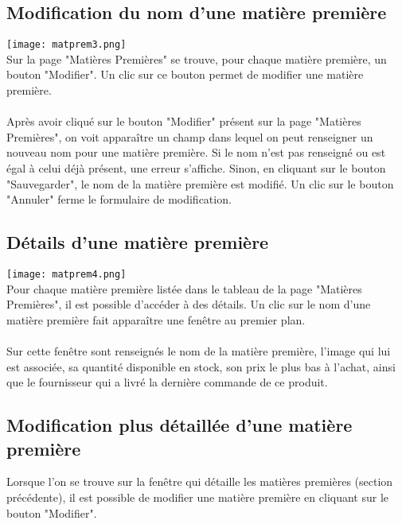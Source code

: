 \subsection{Modification du nom d'une matière première}
\texttt{[image: matprem3.png]}\\
Sur la page "Matières Premières" se trouve, pour chaque matière première, 
un bouton "Modifier". Un clic sur ce bouton permet de modifier une matière 
première.

\paragraph{}
Après avoir cliqué sur le bouton "Modifier" présent sur la page "Matières 
Premières", on voit apparaître un champ dans lequel on peut renseigner un 
nouveau nom pour une matière première. Si le nom n'est pas renseigné ou est 
égal à celui déjà présent, une erreur s'affiche. Sinon, en cliquant sur le 
bouton "Sauvegarder", le nom de la matière première est modifié. Un clic sur 
le bouton "Annuler" ferme le formulaire de modification.


\subsection{Détails d'une matière première}
\texttt{[image: matprem4.png]}\\
Pour chaque matière première listée dans le tableau de la page "Matières 
Premières", il est possible d'accéder à des détails. Un clic sur le nom d'une 
matière première fait apparaître une fenêtre au premier plan.

\paragraph{}
Sur cette fenêtre sont renseignés le nom de la matière première, l'image qui lui 
est associée, sa quantité disponible en stock, son prix le plus bas à l'achat, 
ainsi que le fournisseur qui a livré la dernière commande de ce produit.

\subsection{Modification plus détaillée d'une matière première}
Lorsque l'on se trouve sur la fenêtre qui détaille les matières premières
(section précédente), il est possible de modifier une matière première en 
cliquant sur le bouton "Modifier".

